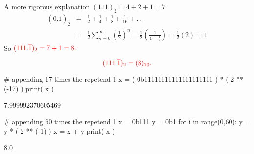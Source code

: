 \documentclass[pdftex,11pt]{article}
\begin{document}
\begin{enumerate}
A more rigorous explanation
$(111)_2 = 4+2+1 = 7$
\begin{eqnarray}
(0.\overline{1})_{2} 
\nonumber & = & \frac{1}{2}+ \frac{1}{4}+ \frac{1}{8}+ \frac{1}{16}+\ldots\\
\nonumber & = & \frac{1}{2}\sum_{n=0}^\infty\left(\frac{1}{2}\right)^n
 = \frac{1}{2}\left(\frac{1}{1-\frac{1}{2}}\right)
 = \frac{1}{2}( 2 )
 = 1
\end{eqnarray}
So $\color{red}(111.\overline{1})_2 = 7 + 1 = 8 .$

$$\color{red}(111.\overline{1})_2 = (8)_{10} .$$


\begin{python}
# appending 17 times the repetend 1
x = ( 0b11111111111111111111 ) * ( 2 ** (-17) )
print( x )
\end{python}
\begin{pythonoutput}
7.999992370605469
\end{pythonoutput}

\begin{python}
# appending 60 times the repetend 1
x = 0b111
y = 0b1
for i in range(0,60):
  y = y * ( 2 ** (-1) )
  x = x + y
print( x )
\end{python}
\begin{pythonoutput}
8.0
\end{pythonoutput}

















\end{enumerate}
\end{document}
